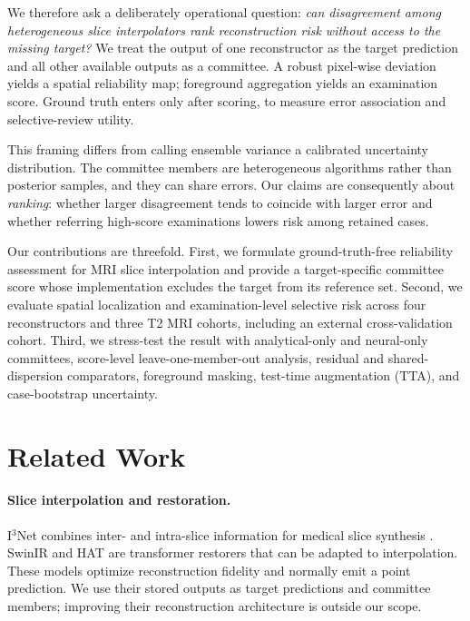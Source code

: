 \documentclass[twocolumn]{article}
\begin{document}
We therefore ask a deliberately operational question: \emph{can disagreement among heterogeneous slice interpolators rank reconstruction risk without access to the missing target?} We treat the output of one reconstructor as the target prediction and all other available outputs as a committee. A robust pixel-wise deviation yields a spatial reliability map; foreground aggregation yields an examination score. Ground truth enters only after scoring, to measure error association and selective-review utility.

This framing differs from calling ensemble variance a calibrated uncertainty distribution. The committee members are heterogeneous algorithms rather than posterior samples, and they can share errors. Our claims are consequently about \emph{ranking}: whether larger disagreement tends to coincide with larger error and whether referring high-score examinations lowers risk among retained cases.

Our contributions are threefold. First, we formulate ground-truth-free reliability assessment for MRI slice interpolation and provide a target-specific committee score whose implementation excludes the target from its reference set. Second, we evaluate spatial localization and examination-level selective risk across four reconstructors and three T2 MRI cohorts, including an external cross-validation cohort. Third, we stress-test the result with analytical-only and neural-only committees, score-level leave-one-member-out analysis, residual and shared-dispersion comparators, foreground masking, test-time augmentation (TTA), and case-bootstrap uncertainty.

\section{Related Work}

\paragraph{Slice interpolation and restoration.}
I$^3$Net combines inter- and intra-slice information for medical slice synthesis \citep{song2024i3net}. SwinIR \citep{liang2021swinir} and HAT \citep{chen2022hat} are transformer restorers that can be adapted to interpolation. These models optimize reconstruction fidelity and normally emit a point prediction. We use their stored outputs as target predictions and committee members; improving their reconstruction architecture is outside our scope.
\end{document}
